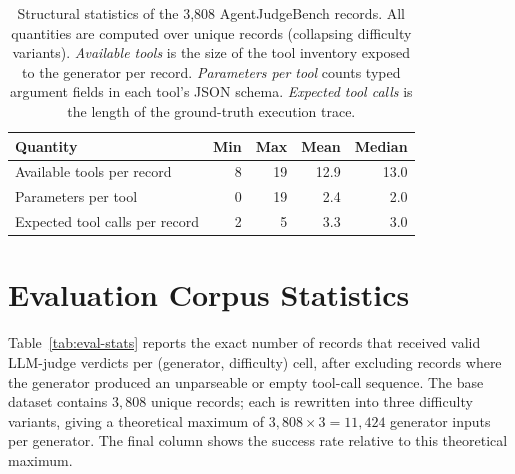 \begin{table}[!htbp]
\centering
\small
\setlength{\tabcolsep}{8pt}
\renewcommand{\arraystretch}{1.2}
\caption{Structural statistics of the 3,808 AgentJudgeBench records. All quantities are computed over unique records (collapsing difficulty variants). \emph{Available tools} is the size of the tool inventory exposed to the generator per record. \emph{Parameters per tool} counts typed argument fields in each tool's JSON schema. \emph{Expected tool calls} is the length of the ground-truth execution trace.}
\label{tab:dataset-stats}
\begin{tabularx}{0.8\textwidth}{@{}Xrrrr@{}}
\toprule
\textbf{Quantity} & \textbf{Min} & \textbf{Max} & \textbf{Mean} & \textbf{Median} \\
\midrule
Available tools per record     &  8 & 19 & 12.9 & 13.0 \\
Parameters per tool            &  0 & 19 &  2.4 &  2.0 \\
Expected tool calls per record &  2 &  5 &  3.3 &  3.0 \\
\bottomrule
\end{tabularx}
\end{table}


\section{Evaluation Corpus Statistics}
\label{app:eval-stats}

Table~\ref{tab:eval-stats} reports the exact number of records that received valid LLM-judge verdicts per (generator, difficulty) cell, after excluding records where the generator produced an unparseable or empty tool-call sequence. The base dataset contains $3{,}808$ unique records; each is rewritten into three difficulty variants, giving a theoretical maximum of $3{,}808 \times 3 = 11{,}424$ generator inputs per generator. The final column shows the success rate relative to this theoretical maximum.

